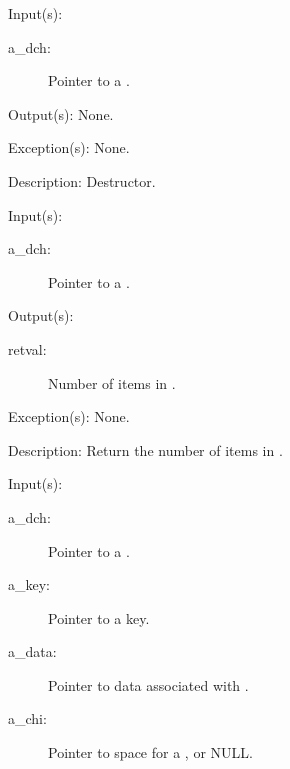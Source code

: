 \begin{capi}
\label{dch_delete}
	\begin{capilist}
	\item[Input(s): ]
		\begin{description}\item[]
		\item[a\_dch: ]
			Pointer to a .
		\end{description}
	\item[Output(s): ] None.
	\item[Exception(s): ] None.
	\item[Description: ]
		Destructor.
	\end{capilist}
\label{dch_count}
	\begin{capilist}
	\item[Input(s): ]
		\begin{description}\item[]
		\item[a\_dch: ]
			Pointer to a \classname{dch}.
		\end{description}
	\item[Output(s): ]
		\begin{description}\item[]
		\item[retval: ]
			Number of items in \cvar{a\_dch}.
		\end{description}
	\item[Exception(s): ] None.
	\item[Description: ]
		Return the number of items in \cvar{a\_dch}.
	\end{capilist}
\label{dch_insert}
	\begin{capilist}
	\item[Input(s): ]
		\begin{description}\item[]
		\item[a\_dch: ]
			Pointer to a .
		\item[a\_key: ]
			Pointer to a key.
		\item[a\_data: ]
			Pointer to data associated with \cvar{a\_key}.
		\item[a\_chi: ]
			Pointer to space for a , or NULL.

\end{description}
\end{capilist}
\end{capi}
